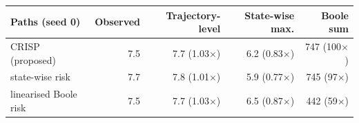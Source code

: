 \begin{tabular}{lrrrr}
\toprule
Paths (seed 0) & Observed & Trajectory-level & State-wise max. & Boole sum \\
\midrule
CRISP (proposed) & 7.5 & 7.7 (1.03$\times$) & 6.2 (0.83$\times$) & 747 (100$\times$) \\
state-wise risk & 7.7 & 7.8 (1.01$\times$) & 5.9 (0.77$\times$) & 745 (97$\times$) \\
linearised Boole risk & 7.5 & 7.7 (1.03$\times$) & 6.5 (0.87$\times$) & 442 (59$\times$) \\
\bottomrule
\end{tabular}
